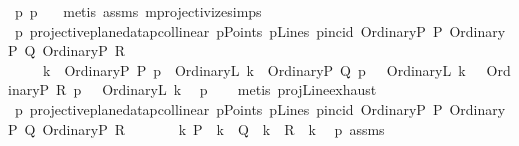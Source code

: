 \begin{isabellebody}
\ p{}\ p{}\ \ \isamarkupfalse%
\ {\isacharparenleft}{\kern0pt}metis\ assms{\isacharparenleft}{\kern0pt}{}{\isacharparenright}{\kern0pt}\ mprojectivize{\isachardot}{\kern0pt}simps{\isacharparenleft}{\kern0pt}{}{\isacharparenright}{\kern0pt}{\isacharparenright}{\kern0pt}\isanewline
\ \ \isamarkupfalse%
\ p{}{\isacharcolon}{\kern0pt}\ {\isachardoublequoteopen}{\isacharparenleft}{\kern0pt}projective{\isacharunderscore}{\kern0pt}plane{\isacharunderscore}{\kern0pt}data{}{\isachardot}{\kern0pt}pcollinear\ pPoints\ pLines\ pincid\ {\isacharparenleft}{\kern0pt}OrdinaryP\ P{\isacharparenright}{\kern0pt}\ {\isacharparenleft}{\kern0pt}OrdinaryP\ Q{\isacharparenright}{\kern0pt}\ {\isacharparenleft}{\kern0pt}OrdinaryP\ R{\isacharparenright}{\kern0pt}{\isacharparenright}{\kern0pt}\ {\isasymLongrightarrow}\ \isanewline
\ \ \ \ {\isasymexists}\ k{\isachardot}{\kern0pt}\ \ {\isacharparenleft}{\kern0pt}OrdinaryP\ P{\isacharparenright}{\kern0pt}\ p{\isasymlhd}\ {\isacharparenleft}{\kern0pt}\ OrdinaryL\ k{\isacharparenright}{\kern0pt}\ {\isasymand}\ {\isacharparenleft}{\kern0pt}OrdinaryP\ Q{\isacharparenright}{\kern0pt}\ p{\isasymlhd}\ \ {\isacharparenleft}{\kern0pt}\ OrdinaryL\ k{\isacharparenright}{\kern0pt}\ {\isasymand}\ \ {\isacharparenleft}{\kern0pt}OrdinaryP\ R{\isacharparenright}{\kern0pt}\ p{\isasymlhd}\ \ {\isacharparenleft}{\kern0pt}\ OrdinaryL\ k{\isacharparenright}{\kern0pt}{\isachardoublequoteclose}\ \isamarkupfalse%
\ p{}\isanewline
\ \ \isamarkupfalse%
\ {\isacharparenleft}{\kern0pt}metis\ projLine{\isachardot}{\kern0pt}exhaust{\isacharparenright}{\kern0pt}\isanewline
\ \ \isamarkupfalse%
\ p{}{}{\isacharcolon}{\kern0pt}\ {\isachardoublequoteopen}{\isacharparenleft}{\kern0pt}projective{\isacharunderscore}{\kern0pt}plane{\isacharunderscore}{\kern0pt}data{}{\isachardot}{\kern0pt}pcollinear\ pPoints\ pLines\ pincid\ {\isacharparenleft}{\kern0pt}OrdinaryP\ P{\isacharparenright}{\kern0pt}\ {\isacharparenleft}{\kern0pt}OrdinaryP\ Q{\isacharparenright}{\kern0pt}\ {\isacharparenleft}{\kern0pt}OrdinaryP\ R{\isacharparenright}{\kern0pt}{\isacharparenright}{\kern0pt}\ {\isasymLongrightarrow}\ \isanewline
\ \ \ \ {\isasymexists}\ k{\isachardot}{\kern0pt}\ P\ {\isasymlhd}\ k\ {\isasymand}\ Q\ {\isasymlhd}\ k\ {\isasymand}\ R\ {\isasymlhd}\ k{\isachardoublequoteclose}\ \isamarkupfalse%
\ p{}\ assms{\isacharparenleft}{\kern0pt}{}{\isacharparenright}{\kern0pt}\ \isamarkupfalse%

\end{isabellebody}
